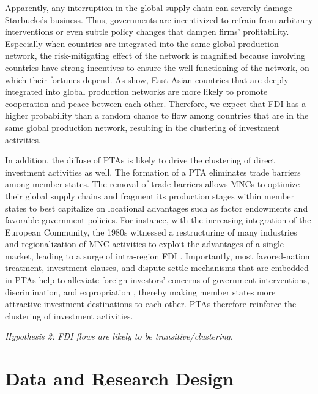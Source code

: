 \documentclass{article}
\begin{document}
Apparently, any interruption in the global supply chain can severely damage Starbucks's business. Thus, governments are incentivized to refrain from arbitrary interventions or even subtle policy changes that dampen firms' profitability. Especially when countries are integrated into the same global production network, the risk-mitigating effect of the network is magnified because involving countries have strong incentives to ensure the well-functioning of the network, on which their fortunes depend. As \citet{Kim_Solingen:2017} show, East Asian countries that are deeply integrated into global production networks are more likely to promote cooperation and peace between each other. Therefore, we expect that FDI has a higher probability than a random chance to flow among countries that are in the same global production network, resulting in the clustering of investment activities.

In addition, the diffuse of PTAs is likely to drive the clustering of direct investment activities as well. The formation of a PTA eliminates trade barriers among member states. The removal of trade barriers allows MNCs to optimize their global supply chains and fragment its production stages within member states to best capitalize on locational advantages such as factor endowments and favorable government policies. For instance, with the increasing integration of the European Community, the 1980s witnessed a restructuring of many industries and regionalization of MNC activities to exploit the advantages of a single market, leading to a surge of intra-region FDI \citep[34]{UNCTAD:1991}. Importantly, most favored-nation treatment, investment clauses, and dispute-settle mechanisms that are embedded in PTAs help to alleviate foreign investors' concerns of government interventions, discrimination, and expropriation \citep{Buthe_Milner:2008,buthe2014foreign}, thereby making member states more attractive investment destinations to each other. PTAs therefore reinforce the clustering of investment activities.

\textit{Hypothesis 2: FDI flows are likely to be transitive/clustering.}




\section{Data and Research Design}
\end{document}
